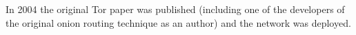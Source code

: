 %
%	
%	
%		
%		
%	
%	
%	
%	
%	
%	
%	
%	
%	
%	
%	
%	
%	
	
In 2004 the original Tor paper was published (including one of the developers of the original onion routing technique as an author) and the network was deployed.